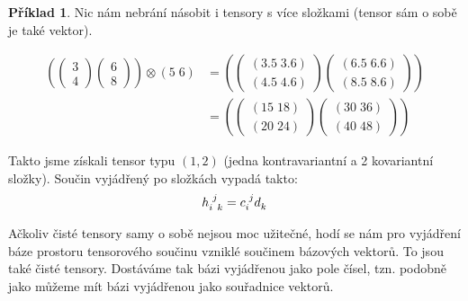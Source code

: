 \documentclass[a5paper,12pt]{amsbook}
\theoremstyle{definition}
\newtheorem{example}{Příklad}[chapter]
\begin{document}
\begin{example}
Nic nám nebrání násobit i tensory s více složkami (tensor sám o sobě je také vektor).

\begin{equation*}
\begin{split}
\left(
\left(\begin{array}{c}
3 \\ 4
\end{array}\right)
\left(\begin{array}{c}
6 \\ 8
\end{array}\right)
\right)\otimes\left(5\;6\right)
&=\left(
\left(\begin{array}{c}
\left(3.5 \; 3.6\right) \\ \left(4.5 \; 4.6\right)
\end{array}\right)
\left(\begin{array}{c}
\left(6.5 \; 6.6\right) \\ \left(8.5 \; 8.6\right)
\end{array}\right)
\right) \\
&=\left(
\left(\begin{array}{c}
\left(15 \; 18\right) \\ \left(20 \; 24\right)
\end{array}\right)
\left(\begin{array}{c}
\left(30 \; 36\right) \\ \left(40 \; 48\right)
\end{array}\right)
\right)
\end{split}
\end{equation*}

Takto jsme získali tensor typu $(1, 2)$ (jedna kontravariantní a 2 kovariantní
složky). Součin vyjádřený po složkách vypadá takto:
\begin{equation*}
\begin{split}
h\indices{_i^j_k} = c\indices{_i^j} d\indices{_k}
\end{split}
\end{equation*}

\end{example}

Ačkoliv čisté tensory samy o sobě nejsou moc užitečné, hodí se nám pro vyjádření
báze prostoru tensorového součinu vzniklé součinem bázových vektorů. To jsou také
čisté tensory. Dostáváme tak bázi vyjádřenou jako pole čísel, tzn. podobně jako
můžeme mít bázi vyjádřenou jako souřadnice vektorů.
\end{document}
